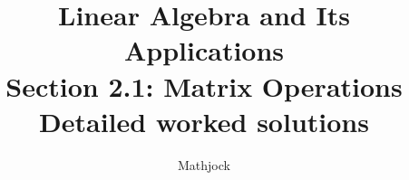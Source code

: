 
\title{\textbf{Linear Algebra and Its Applications}\\[0.3em]Section 2.1: Matrix Operations\\[0.3em]\large Detailed worked solutions}
\author{Mathjock}
\date{}

\maketitle
\bookinfo
\tableofcontents
\clearpage
\renewcommand{\thesection}{2.\arabic{section}}
\renewcommand{\theHsection}{2.\arabic{section}}
\setcounter{section}{0}



